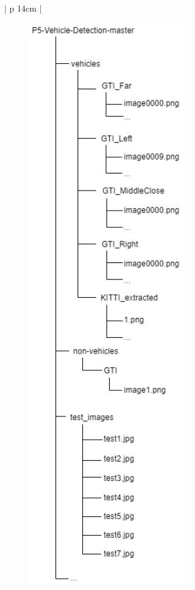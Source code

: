 \begin{table}[H]
	\small
	\begin{adjustbox}{width=1\textwidth}
		\begin{tabular}{| p {14cm} |}
			\hline
			\begin{figure}[H]
				\centering
				\includegraphics[width=7cm]{images/FolderScheme.png}
			\end{figure} \\
			\hline
		\end{tabular}
	\end{adjustbox}
	\label{img:FolderScheme}
\end{table}  

